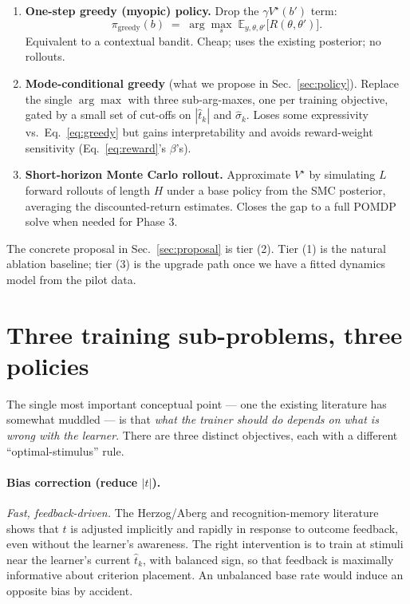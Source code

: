 \documentclass[11pt]{article}
\begin{document}
\begin{enumerate}[leftmargin=*,itemsep=2pt]
  \item \textbf{One-step greedy (myopic) policy.} Drop the
    $\gamma V^{\star}(b')$ term:
    \begin{equation}
      \pi_{\mathrm{greedy}}(b) \;=\;
        \arg\max_{s}\;
        \mathbb{E}_{y, \theta, \theta'}\!
        \bigl[R(\theta, \theta')\bigr].
      \label{eq:greedy}
    \end{equation}
    Equivalent to a contextual bandit. Cheap; uses the existing
    posterior; no rollouts.
  \item \textbf{Mode-conditional greedy} (what we propose in
    Sec.~\ref{sec:policy}). Replace the single $\arg\max$ with three
    sub-arg-maxes, one per training objective, gated by a small set
    of cut-offs on $|\hat t_k|$ and $\hat\sigma_k$. Loses some
    expressivity vs.\ Eq.~\ref{eq:greedy} but gains interpretability
    and avoids reward-weight sensitivity (Eq.~\ref{eq:reward}'s
    $\beta$'s).
  \item \textbf{Short-horizon Monte Carlo rollout.} Approximate
    $V^{\star}$ by simulating $L$ forward rollouts of length $H$
    under a base policy from the SMC posterior, averaging the
    discounted-return estimates. Closes the gap to a full POMDP solve
    when needed for Phase 3.
\end{enumerate}

The concrete proposal in Sec.~\ref{sec:proposal} is tier (2). Tier
(1) is the natural ablation baseline; tier (3) is the upgrade path
once we have a fitted dynamics model from the pilot data.

\section{Three training sub-problems, three policies}
\label{sec:threeproblems}

The single most important conceptual point — one the existing
literature has somewhat muddled — is that \emph{what the trainer should
do depends on what is wrong with the learner}. There are three
distinct objectives, each with a different ``optimal-stimulus'' rule.

\paragraph{Bias correction (reduce $|t|$).}
\textit{Fast, feedback-driven.} The Herzog/Aberg and recognition-memory
literature \citep{han2009criterion} shows that $t$ is adjusted
implicitly and rapidly in response to outcome feedback, even without
the learner's awareness. The right intervention is to train at stimuli
near the learner's current $\hat t_k$, with balanced sign, so that
feedback is maximally informative about criterion placement. An
unbalanced base rate would induce an opposite bias by accident.
\end{document}
